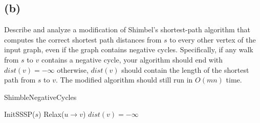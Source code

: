 \documentclass[12pt]{article}
\begin{document}
\pagebreak

\subsection*{(b)}
Describe and analyze a modification of Shimbel's shortest-path
algorithm that computes the correct shortest path distances from $s$ to
every other vertex of the input graph, even if the graph contains
negative cycles. Specifically, if any walk from $s$ to $v$ contains a
negative cycle, your algorithm should end with $dist(v) = -\infty$
otherwise, $dist(v)$ should contain the length of the shortest path
from $s$ to $v$. The modified algorithm should still run in $O(mn)$
time.

\begin{algorithm}
\caption{ShimbleNegativeCycles}
\begin{algorithmic}
    \STATE InitSSSP($s$)
                \STATE Relax($u \rightarrow v$)
            \ENDIF
        \ENDFOR
    \ENDFOR
            \STATE $dist(v) = -\infty$
        \ENDIF
    \ENDFOR
\end{algorithmic}
\end{algorithm}
\end{document}
